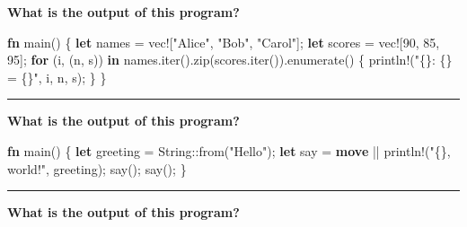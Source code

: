 \documentclass[
  11pt,
]{article}
\newenvironment{Shaded}{}{}
\newcommand{\ControlFlowTok}[1]{\textcolor[rgb]{0.00,0.44,0.13}{\textbf{#1}}}
\newcommand{\DataTypeTok}[1]{\textcolor[rgb]{0.56,0.13,0.00}{#1}}
\newcommand{\DecValTok}[1]{\textcolor[rgb]{0.25,0.63,0.44}{#1}}
\newcommand{\KeywordTok}[1]{\textcolor[rgb]{0.00,0.44,0.13}{\textbf{#1}}}
\newcommand{\NormalTok}[1]{#1}
\newcommand{\OperatorTok}[1]{\textcolor[rgb]{0.40,0.40,0.40}{#1}}
\newcommand{\PreprocessorTok}[1]{\textcolor[rgb]{0.74,0.48,0.00}{#1}}
\newcommand{\StringTok}[1]{\textcolor[rgb]{0.25,0.44,0.63}{#1}}
\begin{document}
\textbf{What is the output of this program?}

\begin{Shaded}
\begin{Highlighting}[]
\KeywordTok{fn}\NormalTok{ main() }\OperatorTok{\{}
    \KeywordTok{let}\NormalTok{ names }\OperatorTok{=} \PreprocessorTok{vec!}\NormalTok{[}\StringTok{"Alice"}\OperatorTok{,} \StringTok{"Bob"}\OperatorTok{,} \StringTok{"Carol"}\NormalTok{]}\OperatorTok{;}
    \KeywordTok{let}\NormalTok{ scores }\OperatorTok{=} \PreprocessorTok{vec!}\NormalTok{[}\DecValTok{90}\OperatorTok{,} \DecValTok{85}\OperatorTok{,} \DecValTok{95}\NormalTok{]}\OperatorTok{;}
    \ControlFlowTok{for}\NormalTok{ (i}\OperatorTok{,}\NormalTok{ (n}\OperatorTok{,}\NormalTok{ s)) }\KeywordTok{in}\NormalTok{ names}\OperatorTok{.}\NormalTok{iter()}\OperatorTok{.}\NormalTok{zip(scores}\OperatorTok{.}\NormalTok{iter())}\OperatorTok{.}\NormalTok{enumerate() }\OperatorTok{\{}
        \PreprocessorTok{println!}\NormalTok{(}\StringTok{"\{\}: \{\} = \{\}"}\OperatorTok{,}\NormalTok{ i}\OperatorTok{,}\NormalTok{ n}\OperatorTok{,}\NormalTok{ s)}\OperatorTok{;}
    \OperatorTok{\}}
\OperatorTok{\}}
\end{Highlighting}
\end{Shaded}

\begin{center}\rule{0.5\linewidth}{0.5pt}\end{center}

\textbf{What is the output of this program?}

\begin{Shaded}
\begin{Highlighting}[]
\KeywordTok{fn}\NormalTok{ main() }\OperatorTok{\{}
    \KeywordTok{let}\NormalTok{ greeting }\OperatorTok{=} \DataTypeTok{String}\PreprocessorTok{::}\NormalTok{from(}\StringTok{"Hello"}\NormalTok{)}\OperatorTok{;}
    \KeywordTok{let}\NormalTok{ say }\OperatorTok{=} \KeywordTok{move} \OperatorTok{||} \PreprocessorTok{println!}\NormalTok{(}\StringTok{"\{\}, world!"}\OperatorTok{,}\NormalTok{ greeting)}\OperatorTok{;}
\NormalTok{    say()}\OperatorTok{;}
\NormalTok{    say()}\OperatorTok{;}
\OperatorTok{\}}
\end{Highlighting}
\end{Shaded}

\begin{center}\rule{0.5\linewidth}{0.5pt}\end{center}

\textbf{What is the output of this program?}
\end{document}
